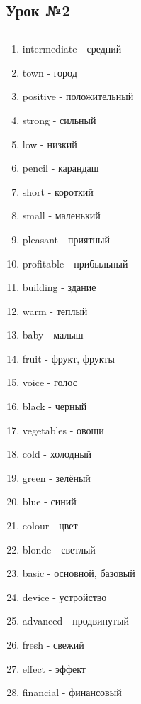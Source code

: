 \subsection{Урок №2}

\subsection*{}
\begin{multicols}{2}
    \begin{enumerate}\setlength{\itemsep}{0pt}
        \item intermediate - средний
        \item town - город
        \item positive - положительный
        \item strong - сильный
        \item low - низкий
        \item pencil - карандаш
        \item short - короткий
        \item small - маленький
        \item pleasant - приятный
        \item profitable - прибыльный
        \item building - здание
        \item warm - теплый
        \item baby - малыш
        \item fruit - фрукт, фрукты
        \item voice - голос
        \item black - черный
        \item vegetables - овощи
        \item cold - холодный
        \item green - зелёный
        \item blue - синий
        \item colour - цвет
        \item blonde - светлый
        \item basic - основной, базовый
        \item device - устройство
        \item advanced - продвинутый
        \item fresh - свежий
        \item effect - эффект
        \item financial - финансовый
    \end{enumerate}
\end{multicols}

\subsection*{}

\begin{verbatim}
\end{verbatim}